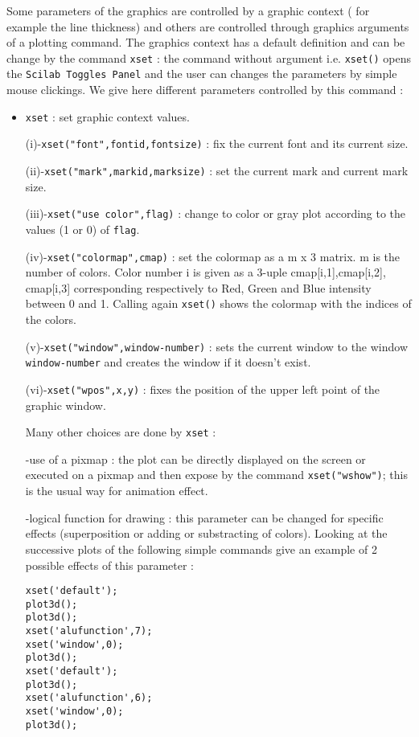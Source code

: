 Some parameters of the graphics are controlled by a graphic context 
( for example the line thickness) and others are controlled through
graphics arguments of a plotting command.
The graphics context has a default definition and can be change by the
command {\tt xset} : the command without argument i.e. {\tt xset()}
opens the {\tt Scilab Toggles Panel} and the user can changes the
parameters by simple mouse clickings. We give here different
parameters controlled by this command :
%
\begin{itemize}
	\item  {\tt xset}		: set graphic context values.

(i)-{\tt xset("font",fontid,fontsize)} 	: fix the current font and 
its current size.

(ii)-{\tt xset("mark",markid,marksize)}	: set the current mark 
and current mark size.

(iii)-{\tt xset("use color",flag)} 	: change to color or gray plot according to 
the values (1 or 0) of {\tt flag}.

(iv)-{\tt xset("colormap",cmap)} 	: set the colormap as a m x 3
matrix. m is the number of colors.  Color number i is given as a
3-uple cmap[i,1],cmap[i,2], cmap[i,3] corresponding respectively to Red,
Green and Blue intensity between 0 and 1. Calling again {\tt xset()} 
shows the colormap with the indices of the colors.

(v)-{\tt xset("window",window-number)}	: sets the current window to the window 
{\tt window-number} and creates the window if it doesn't exist.

(vi)-{\tt xset("wpos",x,y)}	: fixes the position of the upper left point of 
the graphic window.

Many other choices are done by {\tt xset} :
 
-use of a pixmap : the plot can be directly displayed on the screen or
executed on a pixmap and then expose by the command 
{\tt xset("wshow")}; this is the usual way for animation effect.

-logical function for drawing : this parameter can be changed for 
specific effects (superposition or adding or substracting of colors).
Looking at the successive plots of the following simple commands give
an example of 2 possible effects of this parameter :

\begin{verbatim}
xset('default');
plot3d();
plot3d();
xset('alufunction',7);
xset('window',0);
plot3d();
xset('default');
plot3d();
xset('alufunction',6);
xset('window',0);
plot3d();
\end{verbatim} 


\end{itemize}

